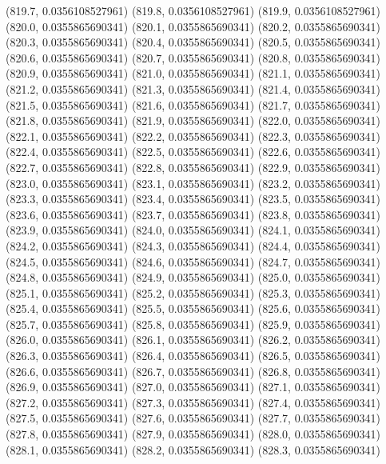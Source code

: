 {					(819.7, 0.0356108527961)
					(819.8, 0.0356108527961)
					(819.9, 0.0356108527961)
					(820.0, 0.0355865690341)
					(820.1, 0.0355865690341)
					(820.2, 0.0355865690341)
					(820.3, 0.0355865690341)
					(820.4, 0.0355865690341)
					(820.5, 0.0355865690341)
					(820.6, 0.0355865690341)
					(820.7, 0.0355865690341)
					(820.8, 0.0355865690341)
					(820.9, 0.0355865690341)
					(821.0, 0.0355865690341)
					(821.1, 0.0355865690341)
					(821.2, 0.0355865690341)
					(821.3, 0.0355865690341)
					(821.4, 0.0355865690341)
					(821.5, 0.0355865690341)
					(821.6, 0.0355865690341)
					(821.7, 0.0355865690341)
					(821.8, 0.0355865690341)
					(821.9, 0.0355865690341)
					(822.0, 0.0355865690341)
					(822.1, 0.0355865690341)
					(822.2, 0.0355865690341)
					(822.3, 0.0355865690341)
					(822.4, 0.0355865690341)
					(822.5, 0.0355865690341)
					(822.6, 0.0355865690341)
					(822.7, 0.0355865690341)
					(822.8, 0.0355865690341)
					(822.9, 0.0355865690341)
					(823.0, 0.0355865690341)
					(823.1, 0.0355865690341)
					(823.2, 0.0355865690341)
					(823.3, 0.0355865690341)
					(823.4, 0.0355865690341)
					(823.5, 0.0355865690341)
					(823.6, 0.0355865690341)
					(823.7, 0.0355865690341)
					(823.8, 0.0355865690341)
					(823.9, 0.0355865690341)
					(824.0, 0.0355865690341)
					(824.1, 0.0355865690341)
					(824.2, 0.0355865690341)
					(824.3, 0.0355865690341)
					(824.4, 0.0355865690341)
					(824.5, 0.0355865690341)
					(824.6, 0.0355865690341)
					(824.7, 0.0355865690341)
					(824.8, 0.0355865690341)
					(824.9, 0.0355865690341)
					(825.0, 0.0355865690341)
					(825.1, 0.0355865690341)
					(825.2, 0.0355865690341)
					(825.3, 0.0355865690341)
					(825.4, 0.0355865690341)
					(825.5, 0.0355865690341)
					(825.6, 0.0355865690341)
					(825.7, 0.0355865690341)
					(825.8, 0.0355865690341)
					(825.9, 0.0355865690341)
					(826.0, 0.0355865690341)
					(826.1, 0.0355865690341)
					(826.2, 0.0355865690341)
					(826.3, 0.0355865690341)
					(826.4, 0.0355865690341)
					(826.5, 0.0355865690341)
					(826.6, 0.0355865690341)
					(826.7, 0.0355865690341)
					(826.8, 0.0355865690341)
					(826.9, 0.0355865690341)
					(827.0, 0.0355865690341)
					(827.1, 0.0355865690341)
					(827.2, 0.0355865690341)
					(827.3, 0.0355865690341)
					(827.4, 0.0355865690341)
					(827.5, 0.0355865690341)
					(827.6, 0.0355865690341)
					(827.7, 0.0355865690341)
					(827.8, 0.0355865690341)
					(827.9, 0.0355865690341)
					(828.0, 0.0355865690341)
					(828.1, 0.0355865690341)
					(828.2, 0.0355865690341)
					(828.3, 0.0355865690341)
}
